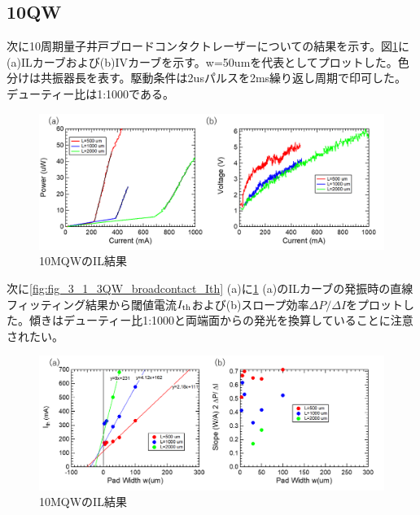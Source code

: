 \subsection{10QW}%
次に10周期量子井戸ブロードコンタクトレーザーについての結果を示す。図\ref{fig:fig_3_1_10QW_broadcontact_IL}に(a)ILカーブおよび(b)IVカーブを示す。w=50umを代表としてプロットした。色分けは共振器長を表す。駆動条件は2usパルスを2ms繰り返し周期で印可した。デューティー比は1:1000である。
\begin{figure}[h]
	\centering
	\includegraphics[width=15cm]{figure/fig_3_1_10QW_broadcontact_IL.png}
		\caption{10MQWのIL結果}
		\label{fig:fig_3_1_10QW_broadcontact_IL}
\end{figure}
次に\ref{fig:fig_3_1_3QW_broadcontact_Ith} (a)に\ref{fig:fig_3_1_10QW_broadcontact_IL} (a)のILカーブの発振時の直線フィッティング結果から閾値電流$I_{\rm{th}}$および(b)スロープ効率$\Delta P/\Delta I$をプロットした。傾きはデューティー比1:1000と両端面からの発光を換算していることに注意されたい。
\begin{figure}[h]
	\centering
	\includegraphics[width=15cm]{figure/fig_3_1_10QW_broadcontact_Ith.png}
		\caption{10MQWのIL結果}
		\label{fig:fig_3_1_10QW_broadcontact_Ith}
\end{figure}

